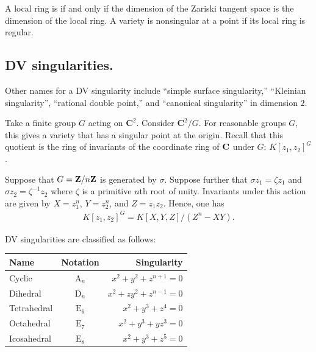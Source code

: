 \documentclass [11 pt, oneside] {article}
\begin{document}
\begin{remark}
	A local ring is  if and only if the dimension of the Zariski tangent space is the dimension of the local ring. A variety is nonsingular at a point if its local ring is regular.
\end{remark}

\subsection{DV singularities.}
Other names for a DV singularity include ``simple surface singularity,'' ``Kleinian singularity'', ``rational double point,'' and ``canonical singularity'' in dimension $2$.

Take a finite group $G$ acting on $\mathbf{C}^2$. Consider $\mathbf{C}^2/G$. For reasonable groups $G$, this gives a variety that has a singular point at the origin. Recall that this quotient is the ring of invariants of the coordinate ring of $\mathbf C$ under $G$: $K[z_1,z_2]^G$. 

Suppose that $G=\mathbf Z / n\mathbf Z$ is generated by $\sigma$. Suppose further that $\sigma z_1 = \zeta z_1$ and $\sigma z_2 =\zeta^{-1}z_2$ where $\zeta$ is a primitive $n$th root of unity. Invariants under this action are given by $X =z_1^n$, $Y=z_2^n$, and $Z=z_1z_2$. Hence, one has
\begin{align*}
	K[z_1,z_2]^G = K[X,Y,Z] / (Z^n- XY).
\end{align*}

DV singularities are classified as follows:
\begin{center}
	\begin{tabular}{lcr}
		Name		& Notation	& Singularity\\
		\midrule
		Cyclic		& $\operatorname{A}_n$	& $x^2+y^2+z^{n+1}=0$\\
		Dihedral		& $\operatorname{D}_n$& $x^2+zy^2+z^{n-1}=0$\\
		Tetrahedral	& $\operatorname{E}_6$	& $x^2+y^3+z^4=0$\\
		Octahedral	& $\operatorname{E}_7$	& $x^2+y^3+yz^3=0$\\
		Icosahedral	& $\operatorname{E}_8$	& $x^2+y^3+z^5=0$
	\end{tabular}
\end{center}
\end{document}
